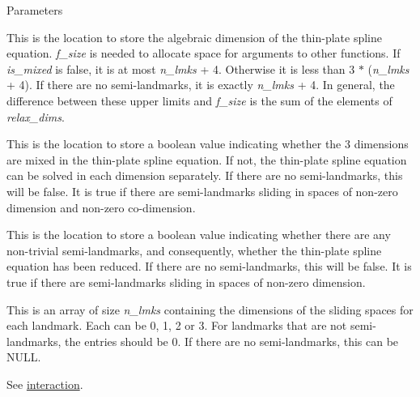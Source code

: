 \begin{DoxyParams}{Parameters}
\item[\mbox{\tt[out]} {\em f\_\-size}]This is the location to store the algebraic dimension of the thin-\/plate spline equation. {\itshape f\_\-size\/} is needed to allocate space for arguments to other functions. If {\itshape is\_\-mixed\/} is {\ttfamily false}, it is at most {\itshape n\_\-lmks\/} + 4. Otherwise it is less than 3 $\ast$ ({\itshape n\_\-lmks\/} + 4). If there are no semi-\/landmarks, it is exactly {\itshape n\_\-lmks\/} + 4. In general, the difference between these upper limits and {\itshape f\_\-size\/} is the sum of the elements of {\itshape relax\_\-dims\/}. \item[\mbox{\tt[out]} {\em is\_\-mixed}]This is the location to store a {\ttfamily boolean} value indicating whether the 3 dimensions are mixed in the thin-\/plate spline equation. If not, the thin-\/plate spline equation can be solved in each dimension separately. If there are no semi-\/landmarks, this will be {\ttfamily false}. It is {\ttfamily true} if there are semi-\/landmarks sliding in spaces of non-\/zero dimension and non-\/zero co-\/dimension. \item[\mbox{\tt[out]} {\em is\_\-reduced}]This is the location to store a {\ttfamily boolean} value indicating whether there are any non-\/trivial semi-\/landmarks, and consequently, whether the thin-\/plate spline equation has been reduced. If there are no semi-\/landmarks, this will be {\ttfamily false}. It is {\ttfamily true} if there are semi-\/landmarks sliding in spaces of non-\/zero dimension. \item[\mbox{\tt[in]} {\em relax\_\-dims\_\-opt}]This is an array of size {\itshape n\_\-lmks\/} containing the dimensions of the sliding spaces for each landmark. Each can be 0, 1, 2 or 3. For landmarks that are not semi-\/landmarks, the entries should be 0. If there are no semi-\/landmarks, this can be {\ttfamily NULL}. \item[\mbox{\tt[in]} {\em n\_\-lmks}]See \hyperlink{classew_1_1Tps3_add5597fd0edb1437c9694d765c507aff}{interaction}. \end{DoxyParams}
